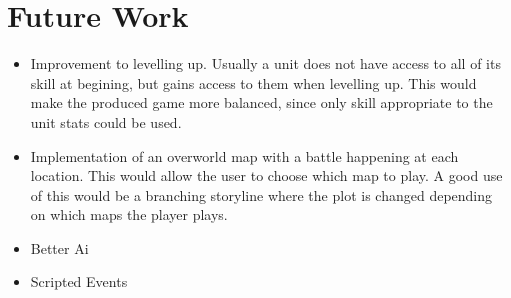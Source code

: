 \section{Future Work}
\begin{itemize}
\item Improvement to levelling up. 
	Usually a unit does not have access to all of its skill at begining, but gains access to them when levelling up.  This would make the produced game  more balanced, since only skill appropriate to the unit stats could be used.

\item Implementation of an overworld map with a battle happening at each location. This would allow the user to choose which map to play.  A good use of this would be a branching storyline where the plot is changed depending on which maps the player plays.
 
\item  Better Ai

\item Scripted Events

\end{itemize}